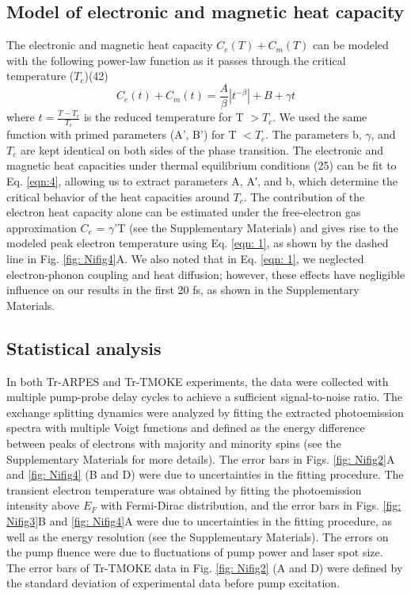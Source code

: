 \subsection{Model of electronic and magnetic heat capacity}
The electronic and magnetic heat capacity $C_e(T)+ C_m(T)$ can be modeled with the following power-law function as it passes through the critical temperature ($T_c$)(42)
\begin{equation}
C_{e}(t)+C_m(t) = \frac{A}{\beta}|t^{-\beta}| + B + \gamma t
\label{eqn:4}
\end{equation}
where $t=\frac{T-T_{c}}{T_c}$ is the reduced temperature for T $> T_c$. We used the same function with primed parameters (A', B') for T $< T_c$. The parameters b, $\gamma$, and $T_c$ are kept identical on both sides of the phase transition. The electronic and magnetic heat capacities under thermal equilibrium conditions (25) can be fit to Eq. \ref{eqn:4}, allowing us to extract parameters A, A′, and b, which determine the critical behavior of the heat capacities around $T_c$. The contribution of the electron heat capacity alone can be estimated under the free-electron gas approximation $C_e$ = $\gamma$’T (see the Supplementary Materials) and gives rise to the modeled peak electron temperature using Eq. \ref{eqn: 1}, as shown by the dashed line in Fig. \ref{fig: Nifig4}A. We also noted that in Eq. \ref{eqn: 1}, we neglected electron-phonon coupling and heat diffusion; however, these effects have negligible influence on our results in the first 20 fs, as shown in the Supplementary Materials.

\subsection{Statistical analysis}
In both Tr-ARPES and Tr-TMOKE experiments, the data were collected with multiple pump-probe delay cycles to achieve a sufficient signal-to-noise ratio. The exchange splitting dynamics were analyzed by fitting the extracted photoemission spectra with multiple Voigt functions and defined as the energy difference between peaks of electrons with majority and minority spins (see the Supplementary Materials for more details). The error bars in Figs. \ref{fig: Nifig2}A and \ref{fig: Nifig4} (B and D) were due to uncertainties in the fitting procedure. The transient electron temperature was obtained by fitting the photoemission intensity above $E_{F}$ with Fermi-Dirac distribution, and the error bars in Figs. \ref{fig: Nifig3}B and \ref{fig: Nifig4}A were due to uncertainties in the fitting procedure, as well as the energy resolution (see the Supplementary Materials). The errors on the pump fluence were due to fluctuations of pump power and laser spot size. The error bars of Tr-TMOKE data in Fig. \ref{fig: Nifig2} (A and D) were defined by the standard deviation of experimental data before pump excitation.


